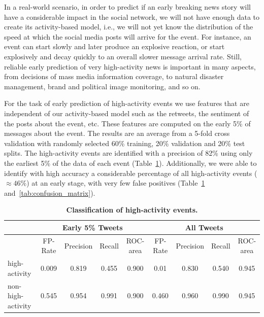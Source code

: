 \documentclass[10pt,letterpaper]{article}
\begin{document}

In a real-world scenario, in order to predict if an early breaking
news story will have a considerable impact in the social network, we
will not have enough data to create its activity-based model, i.e., we
will not yet know the distribution of the speed at which the social
media posts will arrive for the event. For instance, an event can
start slowly and later produce an explosive reaction, or start
explosively and decay quickly to an overall slower message arrival
rate. Still, reliable early prediction of very high-activity news is
important in many aspects, from decisions of mass media information
coverage, to natural disaster management, brand and political image
monitoring, and so on.

For the task of early prediction of high-activity events we use features 
that are independent of our activity-based model such as
the retweets, the sentiment of the posts about the event, etc. 
These features are computed on the early 5\% of messages about the event.
The results are an average from a 5-fold cross validation with
randomly selected 60\% training, 20\% validation and 20\% test splits.
The high-activity events are identified with a precision of 82\% using
only the earliest 5\% of the data of each event
(Table~\ref{tab:classification_results}).  Additionally, we were able to
identify with high accuracy a considerable percentage of all
high-activity events ($\approx 46\%$) at an early stage, with very few
false positives (Table~\ref{tab:classification_results} and~\ref{tab:confusion_matrix}).

\begin{table}
  \centering
  {\small
    \begin{tabularx}{\textwidth}{lcccc|cccc}
      \toprule
      & \multicolumn{4}{c}{\textbf{Early 5\% Tweets}} & \multicolumn{4}{c}{\textbf{All Tweets}} \\
      \midrule
      & FP-Rate & Precision & Recall & ROC-area & FP-Rate & Precision & Recall & ROC-area \\
      high-activity & 0.009 & 0.819 & 0.455 & 0.900 & 0.01 & 0.830 & 0.540 & 0.945 \\
      non-high-activity & 0.545 & 0.954 & 0.991 & 0.900 &  0.460 & 0.960 & 0.990 & 0.945 \\
      \bottomrule
    \end{tabularx}
  }
  \caption{\textbf{Classification of high-activity events.}}
  \label{tab:classification_results}
\end{table}
\end{document}
